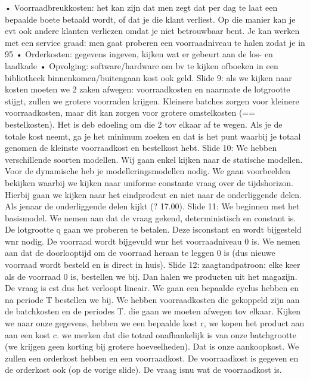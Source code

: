\documentclass[10pt,a4paper]{report}
\begin{document}
	• Voorraadbreukkosten: het kan zijn dat men zegt dat per dag te laat een bepaalde boete betaald wordt, of dat je die klant verliest. Op die manier kan je evt ook andere klanten verliezen omdat je niet betrouwbaar bent. Je kan werken met een service graad: men gaat proberen een voorraadniveau te halen zodat je in 95%
	• Orderkosten: gegevens ingeven, kijken wat er gebeurt aan de los- en laadkade
	• Opvolging: software/hardware om bv te kijken ofboeken in een bibliotheek binnenkomen/buitengaan kost ook geld.
Slide 9: als we kijken naar kosten moeten we 2 zaken afwegen: voorraadkosten en naarmate de lotgrootte stijgt, zullen we grotere voorraden krijgen. Kleinere batches zorgen voor kleinere voorraadkosten, maar dit kan zorgen voor grotere omstelkosten (== bestelkosten). Het is deb edoeling om die 2 tov elkaar af te wegen. Als je de totale kost neemt, ga je het minimum zoeken en dat is het punt waarbij je totaal genomen de kleinste voorraadkost en bestelkost hebt. 
Slide 10: We hebben verschillende soorten modellen. Wij gaan enkel kijken naar de statische modellen. Voor de dynamische heb je modelleringsmodellen nodig.
We gaan voorbeelden bekijken waarbij we kijken naar uniforme constante vraag over de tijdshorizon. Hierbij gaan we kijken naar het eindprodcut en niet naar de onderliggende delen. Als jenaar de onderliggende delen kijkt (? 17.00).
Slide 11: We beginnen met het basismodel. We nemen aan dat de vraag gekend, deterministisch en constant is. De lotgrootte q gaan we proberen te betalen. Deze isconstant en wordt bijgesteld wnr nodig. De voorraad wordt bijgevuld wnr het voorraadniveau 0 is. We nemen aan dat de doorlooptijd om de voorraad heraan te leggen 0 is (dus nieuwe voorraad wordt besteld en is direct in huis).
Slide 12: zaagtandpatroon: elke keer als de voorraad 0 is, bestellen we bij. Dan halen we producten uit het magazijn. De vraag is cst dus het verloopt lineair. We gaan een bepaalde cyclus hebben en na periode T bestellen we bij. 
We hebben voorraadkosten die gekoppeld zijn aan de batchkosten en de periodes T. die gaan we moeten afwegen tov elkaar.
Kijken we naar onze gegevens, hebben we een bepaalde kost r, we kopen het product aan aan een kost c. we merken dat die totaal onafhankelijk is van onze batchgrootte (we krijgen geen korting bij grotere hoeveelheden). Dat is onze aankoopkost. We zullen een orderkost hebben en een voorraadkost. De voorraadkost is gegeven en de orderkost ook (op de vorige slide). De vraag isnu wat de voorraadkost is.
\end{document}
